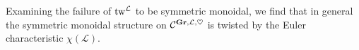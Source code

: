 \begin{rmk}
  Examining the failure of $\mathrm{tw}^{\mathcal{L}}$ to be symmetric monoidal, we find that in general the symmetric monoidal structure on $\mathcal{C}^{\operatorname{\mathbf{Gr}}, \mathcal{L}, \heartsuit}$ is twisted by the Euler characteristic $\chi(\mathcal{L})$.
\end{rmk}
%
%
%
%
%
%
%
%
